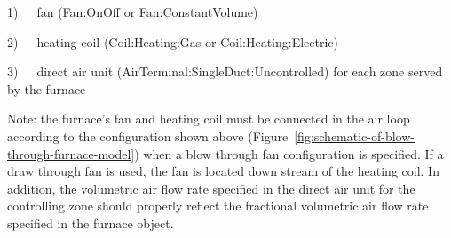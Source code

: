 1)~~~fan (Fan:OnOff or Fan:ConstantVolume)

2)~~~heating coil (Coil:Heating:Gas or Coil:Heating:Electric)

3)~~~direct air unit (AirTerminal:SingleDuct:Uncontrolled) for each zone served by the furnace

Note: the furnace's fan and heating coil must be connected in the air loop according to the configuration shown above (Figure~\ref{fig:schematic-of-blow-through-furnace-model}) when a blow through fan configuration is specified. If a draw through fan is used, the fan is located down stream of the heating coil. In addition, the volumetric air flow rate specified in the direct air unit for the controlling zone should properly reflect the fractional volumetric air flow rate specified in the furnace object.

